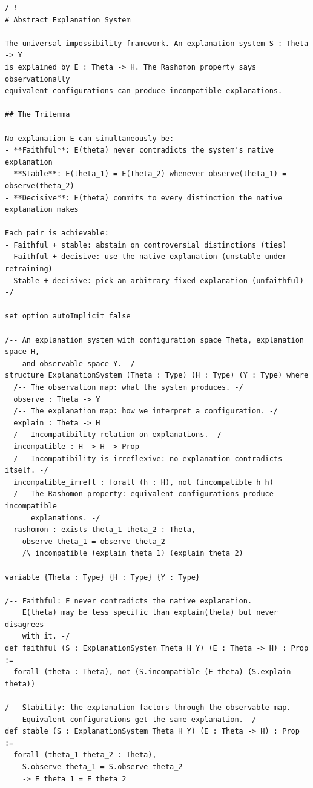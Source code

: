 \documentclass[11pt,a4paper]{article}
\begin{document}
\begin{lstlisting}[caption={ExplanationSystem.lean --- complete file},label={lst:explanation-system}]
/-!
# Abstract Explanation System

The universal impossibility framework. An explanation system S : Theta -> Y
is explained by E : Theta -> H. The Rashomon property says observationally
equivalent configurations can produce incompatible explanations.

## The Trilemma

No explanation E can simultaneously be:
- **Faithful**: E(theta) never contradicts the system's native explanation
- **Stable**: E(theta_1) = E(theta_2) whenever observe(theta_1) = observe(theta_2)
- **Decisive**: E(theta) commits to every distinction the native explanation makes

Each pair is achievable:
- Faithful + stable: abstain on controversial distinctions (ties)
- Faithful + decisive: use the native explanation (unstable under retraining)
- Stable + decisive: pick an arbitrary fixed explanation (unfaithful)
-/

set_option autoImplicit false

/-- An explanation system with configuration space Theta, explanation space H,
    and observable space Y. -/
structure ExplanationSystem (Theta : Type) (H : Type) (Y : Type) where
  /-- The observation map: what the system produces. -/
  observe : Theta -> Y
  /-- The explanation map: how we interpret a configuration. -/
  explain : Theta -> H
  /-- Incompatibility relation on explanations. -/
  incompatible : H -> H -> Prop
  /-- Incompatibility is irreflexive: no explanation contradicts itself. -/
  incompatible_irrefl : forall (h : H), not (incompatible h h)
  /-- The Rashomon property: equivalent configurations produce incompatible
      explanations. -/
  rashomon : exists theta_1 theta_2 : Theta,
    observe theta_1 = observe theta_2
    /\ incompatible (explain theta_1) (explain theta_2)

variable {Theta : Type} {H : Type} {Y : Type}

/-- Faithful: E never contradicts the native explanation.
    E(theta) may be less specific than explain(theta) but never disagrees
    with it. -/
def faithful (S : ExplanationSystem Theta H Y) (E : Theta -> H) : Prop :=
  forall (theta : Theta), not (S.incompatible (E theta) (S.explain theta))

/-- Stability: the explanation factors through the observable map.
    Equivalent configurations get the same explanation. -/
def stable (S : ExplanationSystem Theta H Y) (E : Theta -> H) : Prop :=
  forall (theta_1 theta_2 : Theta),
    S.observe theta_1 = S.observe theta_2
    -> E theta_1 = E theta_2


\end{lstlisting}
\end{document}
